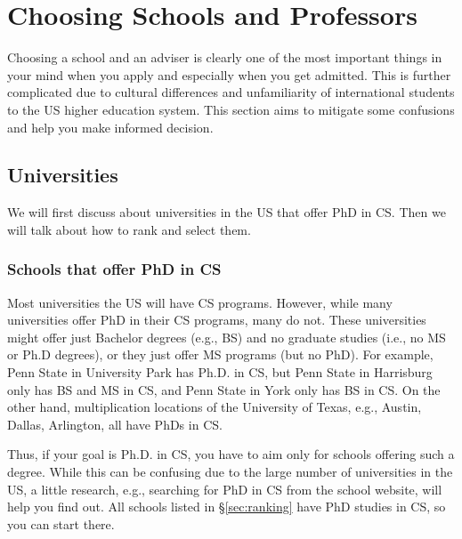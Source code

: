 \documentclass[11pt]{article}
\begin{document}
\section{Choosing Schools and Professors}\label{sec:schoolsandprofs}

Choosing a school and an adviser is clearly one of the most important things in your mind when you apply and especially when you get admitted.  This is further complicated due to cultural differences and unfamiliarity of  international students to the US higher education system.  This section aims to mitigate some confusions and help you make informed decision. 

\subsection{Universities}

We will first discuss about universities in the US that offer PhD in CS. Then we will talk about how to rank and select them.

\subsubsection{Schools that offer PhD in CS}  

Most universities the US will have CS programs. 
However, while many universities offer PhD in their CS programs, many do not.  These universities might offer just Bachelor degrees (e.g., BS) and no graduate studies (i.e., no MS or Ph.D degrees), or they just offer MS programs (but no PhD). For example, Penn State in University Park has Ph.D. in CS,  but Penn State in Harrisburg only has BS and MS in CS, and Penn State in York only has BS in CS.  On the other hand, multiplication locations of the University of Texas, e.g., Austin, Dallas, Arlington, all have PhDs in CS. 

Thus, if your goal is Ph.D. in CS, you have to aim only for schools offering such a degree.  %
While this can be confusing due to the large number of universities in the US, a little research, e.g., searching for PhD in CS from the school website, will help you find out. All schools listed in \S\ref{sec:ranking} have PhD studies in CS, so you can start there.

\end{document}
